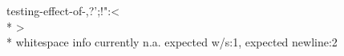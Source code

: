 \documentclass{article}
\begin{document}
testing-effect-of-,?';!":\textless\\*
\textgreater\\*
whitespace info currently n.a. expected w/s:1, expected newline:2
\end{document}
